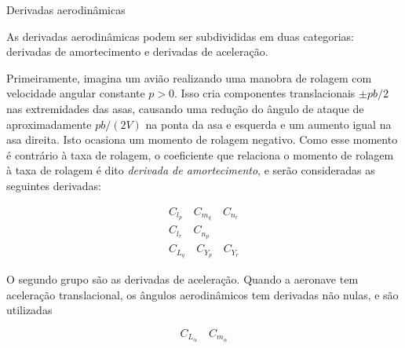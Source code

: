 \documentclass{beamer}
\newcommand{\jindent}{\justifying\setlength{\parindent}{1.5em}}
\begin{document}

\begin{frame}{Derivadas aerodinâmicas}

    \jindent
    As derivadas aerodinâmicas podem ser subdivididas em duas categorias: derivadas de amortecimento e derivadas de aceleração.

    \jindent
    Primeiramente, imagina um avião realizando uma manobra de rolagem com velocidade angular constante $p > 0$. Isso cria componentes translacionais $\pm pb/2$ nas extremidades das asas, causando uma redução do ângulo de ataque de aproximadamente $pb/(2V)$ na ponta da asa e esquerda e um aumento igual na asa direita. Isto ocasiona um momento de rolagem negativo. Como esse momento é contrário à taxa de rolagem, o coeficiente que relaciona o momento de rolagem à taxa de rolagem é dito \textit{derivada de amortecimento}, e serão consideradas as seguintes derivadas:
    
    \begin{gather*}
        C_{l_p} \quad C_{m_q} \quad C_{n_r} \\
        C_{l_r} \quad C_{n_p} \\
        C_{L_q} \quad C_{Y_p} \quad C_{Y_r}
    \end{gather*}

    \jindent
    O segundo grupo são as derivadas de aceleração. Quando a aeronave tem aceleração translacional, os ângulos aerodinâmicos tem derivadas não nulas, e são utilizadas

    \begin{equation*}
        C_{L_{\dot{\alpha}}} \quad C_{m_{\dot{\alpha}}}
    \end{equation*}
\end{frame}

\end{document}
